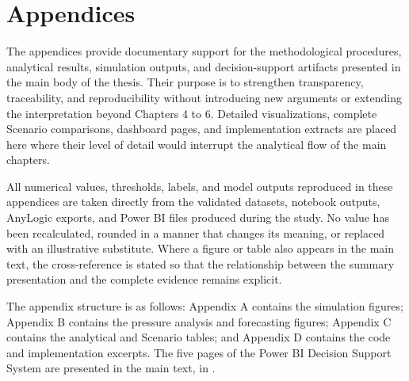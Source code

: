 \chapter{Appendices}
\label{chap:appendices}

The appendices provide documentary support for the methodological procedures, analytical results, simulation outputs, and decision-support artifacts presented in the main body of the thesis. Their purpose is to strengthen transparency, traceability, and reproducibility without introducing new arguments or extending the interpretation beyond Chapters 4 to 6. Detailed visualizations, complete Scenario comparisons, dashboard pages, and implementation extracts are placed here where their level of detail would interrupt the analytical flow of the main chapters.

All numerical values, thresholds, labels, and model outputs reproduced in these appendices are taken directly from the validated datasets, notebook outputs, AnyLogic exports, and Power BI files produced during the study. No value has been recalculated, rounded in a manner that changes its meaning, or replaced with an illustrative substitute. Where a figure or table also appears in the main text, the cross-reference is stated so that the relationship between the summary presentation and the complete evidence remains explicit.

The appendix structure is as follows: Appendix A contains the simulation figures; Appendix B contains the pressure analysis and forecasting figures; Appendix C contains the analytical and Scenario tables; and Appendix D contains the code and implementation excerpts. The five pages of the Power BI Decision Support System are presented in the main text, in .